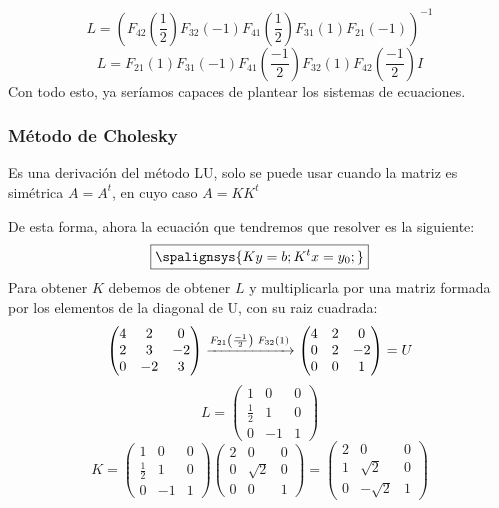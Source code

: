 \[
        L = (F_{42}\left ( \frac{1}{2} \right )F_{32}(-1)F_{41}\left ( \frac{1}{2} \right )F_{31}(1)F_{21}(-1))^{-1}\]
\[L = F_{21}(1)F_{31}(-1)F_{41}\left ( \frac{-1}{2} \right ) F_{32}(1)F_{42}\left ( \frac{-1}{2} \right ) I\]
\noindent Con todo esto, ya seríamos capaces de plantear los sistemas de ecuaciones.
\subsubsection{Método de Cholesky}
\noindent Es una derivación del método LU, solo se puede usar cuando la matriz es simétrica \(A = A^t\), en cuyo caso \(A = KK^t\)
\par \noindent De esta forma, ahora la ecuación que tendremos que resolver es la siguiente:
\[
        \boxed{
                \spalignsys{
                        Ky = b ;
                        K^tx = y_0;
                }}
\]
\noindent Para obtener \(K\) debemos de obtener \(L\) y multiplicarla por una matriz formada por los elementos de la diagonal de U, con su raiz cuadrada:
\[
        \begin{pmatrix}
                4 & 2  & 0  \\
                2 & 3  & -2 \\
                0 & -2 & 3
        \end{pmatrix}
        \xrightarrow[]{F_{21}\left ( \frac{-1}{2} \right ) \hspace{1mm} F_{32}(1)}
        \begin{pmatrix}
                4 & 2 & 0  \\
                0 & 2 & -2 \\
                0 & 0 & 1
        \end{pmatrix}
        = U
\]
\[
        L = \begin{pmatrix}
                1           & 0  & 0 \\
                \frac{1}{2} & 1  & 0 \\
                0           & -1 & 1
        \end{pmatrix}
\]
\[
        K = \begin{pmatrix}
                1           & 0  & 0 \\
                \frac{1}{2} & 1  & 0 \\
                0           & -1 & 1
        \end{pmatrix}
        \begin{pmatrix}
                2 & 0        & 0 \\
                0 & \sqrt{2} & 0 \\
                0 & 0        & 1
        \end{pmatrix}
        =
        \begin{pmatrix}
                2 & 0         & 0 \\
                1 & \sqrt{2}  & 0 \\
                0 & -\sqrt{2} & 1
        \end{pmatrix}
\]
